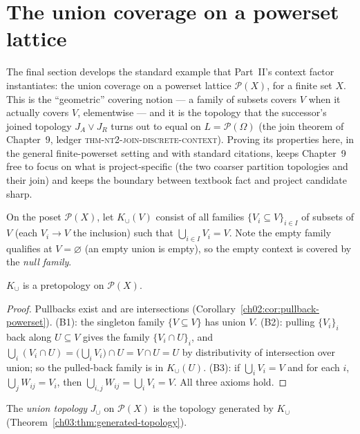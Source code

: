 \section{The union coverage on a powerset lattice}\label{ch03:sec:union}

The final section develops the standard example that Part~II's
context factor instantiates: the union coverage on a powerset
lattice $\mathcal{P}(X)$, for a finite set $X$. This is the
``geometric'' covering notion --- a family of subsets covers $V$
when it actually covers $V$, elementwise --- and it is the
topology that the successor's joined topology $J_A \vee J_R$ turns
out to equal on $L = \mathcal{P}(\Omega)$ (the join theorem of
Chapter~9, ledger \textsc{thm-nt2-join-discrete-context}). Proving
its properties here, in the general finite-powerset setting and
with standard citations, keeps Chapter~9 free to focus on what is
project-specific (the two coarser partition topologies and their
join) and keeps the boundary between textbook fact and project
candidate sharp.

\begin{definition}\label{ch03:def:union-coverage}
On the poset $\mathcal{P}(X)$, let $K_{\cup}(V)$ consist of all
families $\{V_i \subseteq V\}_{i \in I}$ of subsets of $V$ (each
$V_i \to V$ the inclusion) such that $\bigcup_{i \in I} V_i = V$.
Note the empty family qualifies at $V = \varnothing$ (an empty
union is empty), so the empty context is covered by the
\emph{null family}.
\end{definition}

\begin{proposition}\label{ch03:prop:union-pretopology}
$K_{\cup}$ is a pretopology on $\mathcal{P}(X)$.
\end{proposition}

\begin{proof}
Pullbacks exist and are intersections
(Corollary~\ref{ch02:cor:pullback-powerset}). (B1): the singleton
family $\{V \subseteq V\}$ has union $V$. (B2): pulling
$\{V_i\}_i$ back along $U \subseteq V$ gives the family
$\{V_i \cap U\}_i$, and
$\bigcup_i (V_i \cap U) = \bigl(\bigcup_i V_i\bigr) \cap U
= V \cap U = U$
by distributivity of intersection over union; so the pulled-back
family is in $K_{\cup}(U)$. (B3): if $\bigcup_i V_i = V$ and for
each $i$, $\bigcup_j W_{ij} = V_i$, then
$\bigcup_{i,j} W_{ij} = \bigcup_i V_i = V$. All three axioms hold.
\end{proof}

\begin{definition}\label{ch03:def:union-topology}
The \emph{union topology} $J_{\cup}$ on $\mathcal{P}(X)$ is the
topology generated by $K_{\cup}$
(Theorem~\ref{ch03:thm:generated-topology}).
\end{definition}

